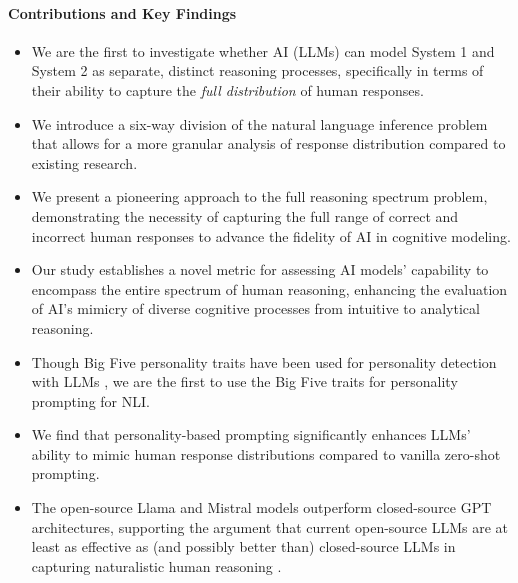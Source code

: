     
    \paragraph{Contributions and Key Findings}
        \begin{itemize}
            \item We are the first to investigate whether AI (LLMs) can model System 1 and System 2 as separate, distinct reasoning processes, specifically in terms of their ability to capture the \textit{full distribution} of human responses.
            \item We introduce a six-way division of the natural language inference problem that allows for a more granular analysis of response distribution compared to existing research.
            \item We present a pioneering approach to the full reasoning spectrum problem, demonstrating the necessity of capturing the full range of correct and incorrect human responses to advance the fidelity of AI in cognitive modeling.
            \item Our study establishes a novel metric for assessing AI models' capability to encompass the entire spectrum of human reasoning, enhancing the evaluation of AI's mimicry of diverse cognitive processes from intuitive to analytical reasoning.
            \item Though Big Five personality traits have been used for personality detection with LLMs \citep{kazemeini_interpretable_2021, pellert_ai_2024, wen_affective-_2024}, we are the first to use the Big Five traits for personality prompting for NLI.
            \item We find that personality-based prompting significantly enhances LLMs' ability to mimic human response distributions compared to vanilla zero-shot prompting.
            \item The open-source Llama and Mistral models outperform closed-source GPT architectures, supporting the argument that current open-source LLMs are at least as effective as (and possibly better than) closed-source LLMs in capturing naturalistic human reasoning \citep{ahmed_studying_2024}.
        \end{itemize}